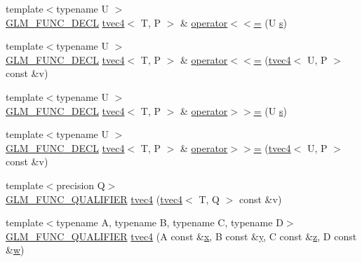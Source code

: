 \begin{DoxyCompactItemize}
\item 
{\footnotesize template$<$typename U $>$ }\\\hyperlink{setup_8hpp_ab2d052de21a70539923e9bcbf6e83a51}{G\+L\+M\+\_\+\+F\+U\+N\+C\+\_\+\+D\+E\+CL} \hyperlink{structglm_1_1detail_1_1tvec4}{tvec4}$<$ T, P $>$ \& \hyperlink{structglm_1_1detail_1_1tvec4_a710de783451759b12b3e5a5764833cbf}{operator$<$$<$=} (U \hyperlink{structglm_1_1detail_1_1tvec4_a82cbced4cbd070056c5acbc1d4d4906f}{s})
\item 
{\footnotesize template$<$typename U $>$ }\\\hyperlink{setup_8hpp_ab2d052de21a70539923e9bcbf6e83a51}{G\+L\+M\+\_\+\+F\+U\+N\+C\+\_\+\+D\+E\+CL} \hyperlink{structglm_1_1detail_1_1tvec4}{tvec4}$<$ T, P $>$ \& \hyperlink{structglm_1_1detail_1_1tvec4_a42e78a66bcb14999e38ff18ccfcd14d1}{operator$<$$<$=} (\hyperlink{structglm_1_1detail_1_1tvec4}{tvec4}$<$ U, P $>$ const \&v)
\item 
{\footnotesize template$<$typename U $>$ }\\\hyperlink{setup_8hpp_ab2d052de21a70539923e9bcbf6e83a51}{G\+L\+M\+\_\+\+F\+U\+N\+C\+\_\+\+D\+E\+CL} \hyperlink{structglm_1_1detail_1_1tvec4}{tvec4}$<$ T, P $>$ \& \hyperlink{structglm_1_1detail_1_1tvec4_aff212ccd60efa8fa3a4c7e642afa6046}{operator$>$$>$=} (U \hyperlink{structglm_1_1detail_1_1tvec4_a82cbced4cbd070056c5acbc1d4d4906f}{s})
\item 
{\footnotesize template$<$typename U $>$ }\\\hyperlink{setup_8hpp_ab2d052de21a70539923e9bcbf6e83a51}{G\+L\+M\+\_\+\+F\+U\+N\+C\+\_\+\+D\+E\+CL} \hyperlink{structglm_1_1detail_1_1tvec4}{tvec4}$<$ T, P $>$ \& \hyperlink{structglm_1_1detail_1_1tvec4_ad8f7d2a8465cfd294b47b33639127ebf}{operator$>$$>$=} (\hyperlink{structglm_1_1detail_1_1tvec4}{tvec4}$<$ U, P $>$ const \&v)
\item 
{\footnotesize template$<$precision Q$>$ }\\\hyperlink{setup_8hpp_a33fdea6f91c5f834105f7415e2a64407}{G\+L\+M\+\_\+\+F\+U\+N\+C\+\_\+\+Q\+U\+A\+L\+I\+F\+I\+ER} \hyperlink{structglm_1_1detail_1_1tvec4_a3030b13b21c84c52f89f14f802ae99f5}{tvec4} (\hyperlink{structglm_1_1detail_1_1tvec4}{tvec4}$<$ T, Q $>$ const \&v)
\item 
{\footnotesize template$<$typename A, typename B, typename C, typename D$>$ }\\\hyperlink{setup_8hpp_a33fdea6f91c5f834105f7415e2a64407}{G\+L\+M\+\_\+\+F\+U\+N\+C\+\_\+\+Q\+U\+A\+L\+I\+F\+I\+ER} \hyperlink{structglm_1_1detail_1_1tvec4_ad49650086418f165378a3cb3bd6dff22}{tvec4} (A const \&\hyperlink{structglm_1_1detail_1_1tvec4_a432497fdfcbcf5ccd75b822cdebafe6b}{x}, B const \&\hyperlink{structglm_1_1detail_1_1tvec4_a693e41210b49a742eb6c1fd0eb8acb3a}{y}, C const \&\hyperlink{structglm_1_1detail_1_1tvec4_a382ff89e1d0594bd8366d532b4e3c28a}{z}, D const \&\hyperlink{structglm_1_1detail_1_1tvec4_a6b1f294d076a4a08420e7d8131a2f0ea}{w})

\end{DoxyCompactItemize}
